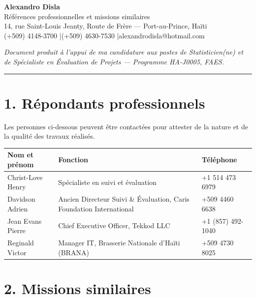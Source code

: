 \documentclass[11pt,a4paper]{article}
\begin{document}
\begin{center}
    {\LARGE\bfseries\color{cvblue} Alexandro Disla}\\[2pt]
    {\large Références professionnelles et missions similaires}\\[6pt]
    {\small 14, rue Saint-Louis Jeanty, Route de Frère --- Port-au-Prince, Haïti\\
    (+509) 4148-3700 \quad|\quad (+509) 4630-7530 \quad|\quad alexandrodisla@hotmail.com}
\end{center}

\vspace{4pt}
{\small\itshape Document produit à l'appui de ma candidature aux postes de Statisticien(ne) et de
Spécialiste en Évaluation de Projets --- Programme HA-J0005, FAES.}

\vspace{10pt}
\hrule
\vspace{12pt}

\section*{\color{cvblue}1. Répondants professionnels}

Les personnes ci-dessous peuvent être contactées pour attester de la nature et de la qualité des
travaux réalisés.

\vspace{4pt}
\begin{longtable}{L{5cm} L{6.5cm} L{4.5cm}}
\toprule
\textbf{Nom et prénom} & \textbf{Fonction} & \textbf{Téléphone} \\
\midrule
\endhead
Christ-Love Henry & Spécialiste en suivi et évaluation & +1 514 473 6979 \\
\addlinespace
Davidson Adrien & Ancien Directeur Suivi \& Évaluation, Caris Foundation International & +509 4460 6638 \\
\addlinespace
Jean Evans Pierre & Chief Executive Officer, Tekkod LLC & +1 (857) 492-1040 \\
\addlinespace
Reginald Victor & Manager IT, Brasserie Nationale d'Haïti (BRANA) & +509 4730 8025 \\
\bottomrule
\end{longtable}

\vspace{10pt}

\section*{\color{cvblue}2. Missions similaires}
\end{document}
